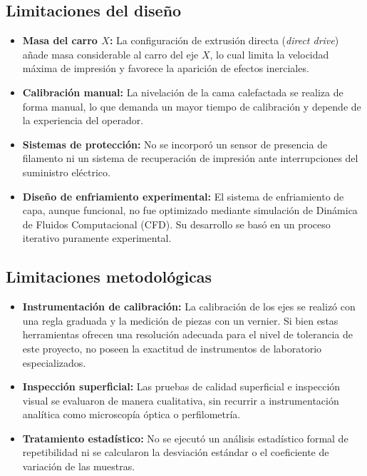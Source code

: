 \subsection*{Limitaciones del diseño}
\begin{itemize}
    \item \textbf{Masa del carro $X$:} La configuración de extrusión directa (\textit{direct drive}) añade masa considerable al carro del eje $X$, lo cual limita la velocidad máxima de impresión y favorece la aparición de efectos inerciales.
    
    \item \textbf{Calibración manual:} La nivelación de la cama calefactada se realiza de forma manual, lo que demanda un mayor tiempo de calibración y depende de la experiencia del operador.
    
    \item \textbf{Sistemas de protección:} No se incorporó un sensor de presencia de filamento ni un sistema de recuperación de impresión ante interrupciones del suministro eléctrico.
    
    \item \textbf{Diseño de enfriamiento experimental:} El sistema de enfriamiento de capa, aunque funcional, no fue optimizado mediante simulación de Dinámica de Fluidos Computacional (CFD). Su desarrollo se basó en un proceso iterativo puramente experimental.
\end{itemize}

\subsection*{Limitaciones metodológicas}
\begin{itemize}
    \item \textbf{Instrumentación de calibración:} La calibración de los ejes se realizó con una regla graduada y la medición de piezas con un vernier. Si bien estas herramientas ofrecen una resolución adecuada para el nivel de tolerancia de este proyecto, no poseen la exactitud de instrumentos de laboratorio especializados.
    
    \item \textbf{Inspección superficial:} Las pruebas de calidad superficial e inspección visual se evaluaron de manera cualitativa, sin recurrir a instrumentación analítica como microscopía óptica o perfilometría.
    
    \item \textbf{Tratamiento estadístico:} No se ejecutó un análisis estadístico formal de repetibilidad ni se calcularon la desviación estándar o el coeficiente de variación de las muestras.
\end{itemize}

